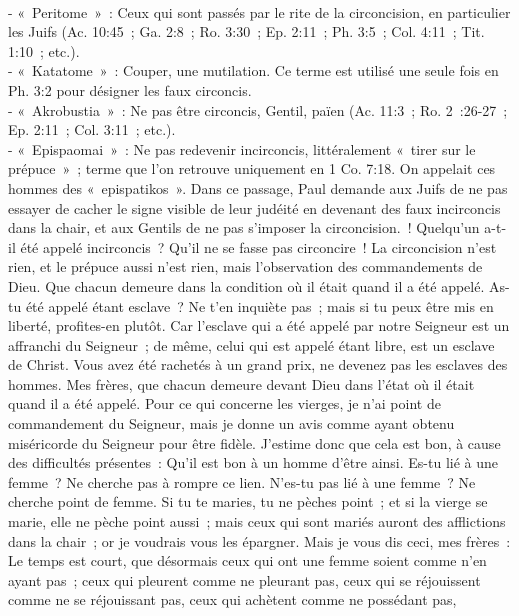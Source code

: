 \begin{multicols}{2}
{\\- «~Peritome~»~: Ceux qui sont passés par le rite de la circoncision, en particulier les Juifs (Ac. 10:45~; Ga. 2:8~; Ro. 3:30~; Ep. 2:11~; Ph. 3:5~; Col. 4:11~; Tit. 1:10~; etc.).
\\- «~Katatome~»~: Couper, une mutilation. Ce terme est utilisé une seule fois en Ph. 3:2 pour désigner les faux circoncis. 
\\- «~Akrobustia~»~: Ne pas être circoncis, Gentil, païen (Ac. 11:3~; Ro. 2~:26-27~; Ep. 2:11~; Col. 3:11~; etc.). 
\\- «~Epispaomai~»~: Ne pas redevenir incirconcis, littéralement «~tirer sur le prépuce~»~; terme que l'on retrouve uniquement en 1 Co. 7:18. On appelait ces hommes des «~epispatikos~». Dans ce passage, Paul demande aux Juifs de ne pas essayer de cacher le signe visible de leur judéité en devenant des faux incirconcis dans la chair, et aux Gentils de ne pas s'imposer la circoncision.}~! Quelqu'un a-t-il été appelé incirconcis~? Qu'il ne se fasse pas circoncire~!
La circoncision n'est rien, et le prépuce aussi n'est rien, mais l'observation des commandements de Dieu.
Que chacun demeure dans la condition où il était quand il a été appelé.
As-tu été appelé étant esclave~? Ne t'en inquiète pas~; mais si tu peux être mis en liberté, profites-en plutôt.
Car l'esclave qui a été appelé par notre Seigneur est un affranchi du Seigneur~; de même, celui qui est appelé étant libre, est un esclave de Christ.
Vous avez été rachetés à un grand prix, ne devenez pas les esclaves des hommes.
Mes frères, que chacun demeure devant Dieu dans l'état où il était quand il a été appelé.
Pour ce qui concerne les vierges, je n'ai point de commandement du Seigneur, mais je donne un avis comme ayant obtenu miséricorde du Seigneur pour être fidèle.
J'estime donc que cela est bon, à cause des difficultés présentes~: Qu'il est bon à un homme d'être ainsi.
Es-tu lié à une femme~? Ne cherche pas à rompre ce lien. N'es-tu pas lié à une femme~? Ne cherche point de femme.
Si tu te maries, tu ne pèches point~; et si la vierge se marie, elle ne pèche point aussi~; mais ceux qui sont mariés auront des afflictions dans la chair~; or je voudrais vous les épargner.
Mais je vous dis ceci, mes frères~: Le temps est court, que désormais ceux qui ont une femme soient comme n'en ayant pas~;
ceux qui pleurent comme ne pleurant pas, ceux qui se réjouissent comme ne se réjouissant pas, ceux qui achètent comme ne possédant pas,

\end{multicols}

